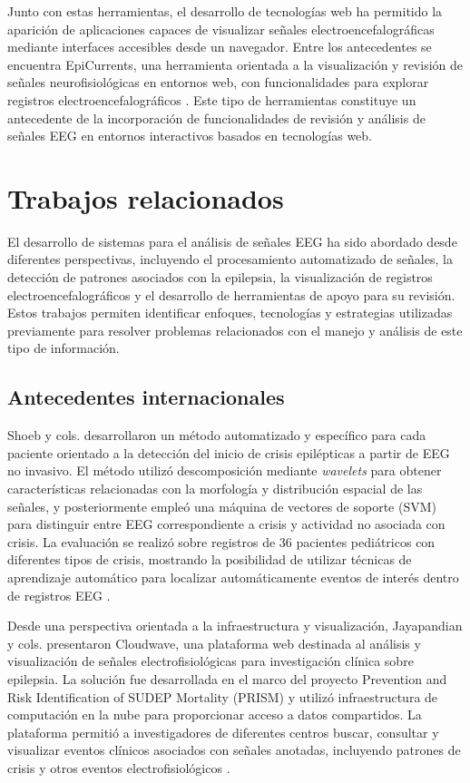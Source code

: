 Junto con estas herramientas, el desarrollo de tecnologías web ha permitido
la aparición de aplicaciones capaces de visualizar señales
electroencefalográficas mediante interfaces accesibles desde un navegador.
Entre los antecedentes se encuentra EpiCurrents, una herramienta orientada
a la visualización y revisión de señales neurofisiológicas en entornos web,
con funcionalidades para explorar registros electroencefalográficos
\citep{EpiCurrentsWebViewer}.
Este tipo de herramientas constituye un antecedente de la incorporación
de funcionalidades de revisión y análisis de señales EEG en entornos
interactivos basados en tecnologías web.

\section{Trabajos relacionados}
\label{sec:trabajos-relacionados}

El desarrollo de sistemas para el análisis de señales EEG ha sido abordado
desde diferentes perspectivas, incluyendo el procesamiento automatizado de
señales, la detección de patrones asociados con la epilepsia, la visualización
de registros electroencefalográficos y el desarrollo de herramientas de apoyo
para su revisión. Estos trabajos permiten identificar enfoques, tecnologías y
estrategias utilizadas previamente para resolver problemas relacionados con
el manejo y análisis de este tipo de información.

\subsection{Antecedentes internacionales}
\label{subsec:antecedentes-internacionales}

Shoeb y cols. desarrollaron un método automatizado y específico para cada
paciente orientado a la detección del inicio de crisis epilépticas a partir
de EEG no invasivo. El método utilizó descomposición mediante \textit{wavelets} para obtener características relacionadas con la morfología y distribución
espacial de las señales, y posteriormente empleó una máquina de vectores de
soporte (SVM) para distinguir entre EEG correspondiente a crisis y actividad
no asociada con crisis. La evaluación se realizó sobre registros de 36
pacientes pediátricos con diferentes tipos de crisis, mostrando la
posibilidad de utilizar técnicas de aprendizaje automático para localizar
automáticamente eventos de interés dentro de registros EEG
\citep{Shoeb2004SeizureDetection}.

Desde una perspectiva orientada a la infraestructura y visualización,
Jayapandian y cols. presentaron Cloudwave, una plataforma web destinada al
análisis y visualización de señales electrofisiológicas para investigación
clínica sobre epilepsia. La solución fue desarrollada en el marco del proyecto
Prevention and Risk Identification of SUDEP Mortality (PRISM) y utilizó
infraestructura de computación en la nube para proporcionar acceso a datos
compartidos. La plataforma permitió a investigadores de diferentes centros
buscar, consultar y visualizar eventos clínicos asociados con señales
anotadas, incluyendo patrones de crisis y otros eventos electrofisiológicos
\citep{Jayapandian2013Cloudwave}.

